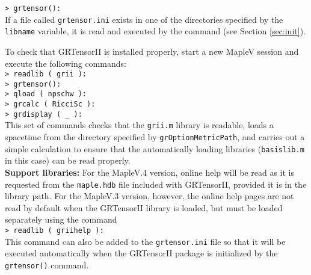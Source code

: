 \documentclass{article}
\begin{document}
\noindent\texttt{> grtensor():}\\

\noindent If a file called \texttt{grtensor.ini} exists in one of the
directories specified by the \texttt{libname} variable, it is read
and executed by the  command (see Section \ref{sec:init}).

To check that GRTensorII is installed properly, start a new MapleV
session and execute the following commands:\\

\noindent\texttt{> readlib ( grii ):\\
\noindent > grtensor():\\
\noindent > qload ( npschw ):\\
\noindent > grcalc ( RicciSc ):\\
\noindent > grdisplay ( \_ ):}\\

\noindent This set of commands checks that the \texttt{grii.m} library
is readable, loads a spacetime from the directory specified by
\texttt{grOptionMetricPath}, and carries out a simple calculation to
ensure that the automatically loading libraries (\texttt{basislib.m}
in this case) can be read properly.\\

\noindent\textbf{Support libraries:} For the MapleV.4 version, online
help will be read as it is requested from the \texttt{maple.hdb} file
included with GRTensorII, provided it is in the library path.
For the MapleV.3 version, however, the online help pages are
not read by default when the GRTensorII library is loaded,
but must be loaded separately using the command\\

\noindent\texttt{> readlib ( griihelp ):}\\

\noindent This command can also be added to the \texttt{grtensor.ini} file so
that it will be executed automatically when the GRTensorII package is
initialized by the \texttt{grtensor()} command.\\
\end{document}
